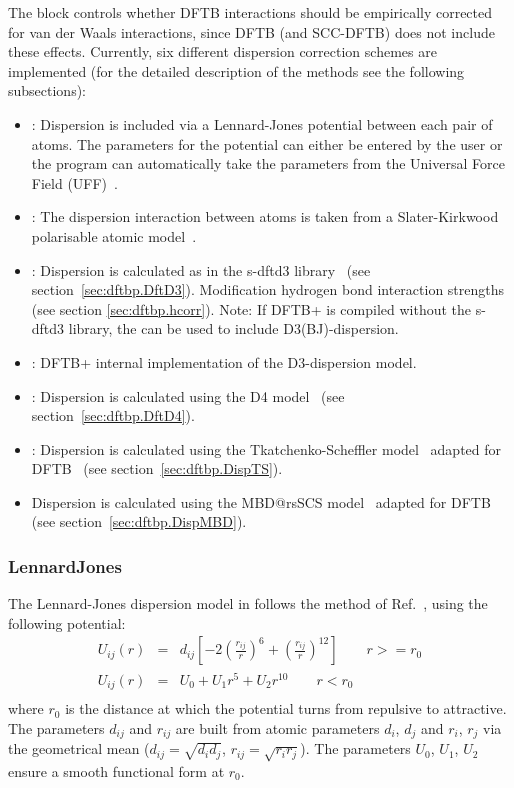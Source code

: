 The  block controls whether DFTB interactions should be
empirically corrected for van der Waals interactions, since DFTB (and
SCC-DFTB) does not include these effects. Currently, six different
dispersion correction schemes are implemented (for the detailed
description of the methods see the following subsections):
\begin{itemize}
\item {}: Dispersion is included via a Lennard-Jones
  potential between each pair of atoms. The parameters for the
  potential can either be entered by the user or the program can
  automatically take the parameters from the Universal Force Field
  (UFF)~\cite{rappe-JACS-114-10024}.
\item {}: The dispersion interaction between atoms is
  taken from a Slater-Kirkwood polarisable atomic
  model~\cite{elstner-jcp-114-5149}.
\item {}: Dispersion is calculated as in the s-dftd3
  library~\cite{grimme-jcp-132-154104,grimme-jcp-32-1456-1465} (see
  section~\ref{sec:dftbp.DftD3}). Modification hydrogen bond interaction
  strengths (see section \ref{sec:dftbp.hcorr}).
  Note: If DFTB+ is compiled without the s-dftd3 library, the
   can be used to include D3(BJ)-dispersion.
\item {}: DFTB+ internal implementation of the D3-dispersion model.
\item {}: Dispersion is calculated using the D4
  model~\cite{caldweyher-jcp-147-034112,caldeweyher-jcp-150-154122} (see
  section~\ref{sec:dftbp.DftD4}).
\item {}: Dispersion is calculated using the Tkatchenko-Scheffler model~\cite{TkatchenkoPRL09}
adapted for DFTB~\cite{StohrJCP16} (see section~\ref{sec:dftbp.DispTS}).
\item {} Dispersion is calculated using the MBD@rsSCS model~\cite{AmbrosettiJCP14}
adapted for DFTB~\cite{StohrJCP16} (see section~\ref{sec:dftbp.DispMBD}).
\end{itemize}

\subsubsection{LennardJones}
\label{sec:dftbp.LennardJones}

The Lennard-Jones dispersion model in \dftbp{} follows the method of
Ref.~\cite{zhechkov-JCTC-1-841}, using the following potential:
\begin{eqnarray*}
U_{ij}(r)&=&d_{ij}\left[-2\left(\frac{r_{ij}}{r}\right)^6 +
  \left(\frac{r_{ij}}{r}\right)^{12}\right]\qquad r >= r_0\\
U_{ij}(r)&=&U_0 + U_1 r^5 + U_2 r^{10}\qquad r < r_0\\
\end{eqnarray*}
where $r_0$ is the distance at which the potential turns from
repulsive to attractive. The parameters $d_{ij}$ and $r_{ij}$ are
built from atomic parameters $d_i$, $d_j$ and $r_i$, $r_j$ via the
geometrical mean ($d_{ij} = \sqrt{d_id_j}$,
$r_{ij}=\sqrt{r_ir_j}$). The parameters $U_0$, $U_1$, $U_2$ ensure a
smooth functional form at $r_0$.


